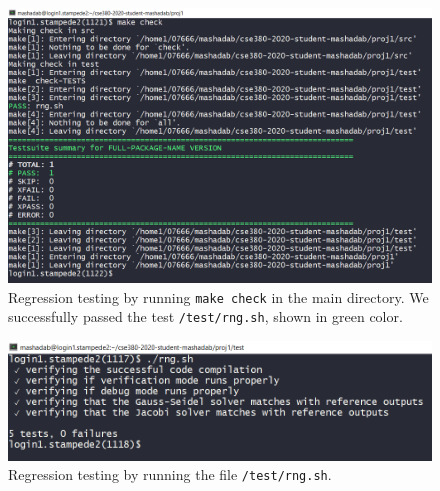 \documentclass[12pt]{amsart}   %
\begin{document}
\begin{figure}[htbp!]
\centering
    \includegraphics[width=1.3\linewidth]{Project1photos/makecheck.png}
    \caption{Regression testing by running {\tt{make check}} in the main directory. We successfully passed the test {\tt{/test/rng.sh}}, shown in green color.}
    \label{fig:7}
\end{figure}

\begin{figure}[htbp!]
\centering
    \includegraphics[width=1.3\linewidth]{Project1photos/individualrng.png}
    \caption{Regression testing by running the file {\tt{/test/rng.sh}}.}
    \label{fig:8}
\end{figure}
\end{document}
